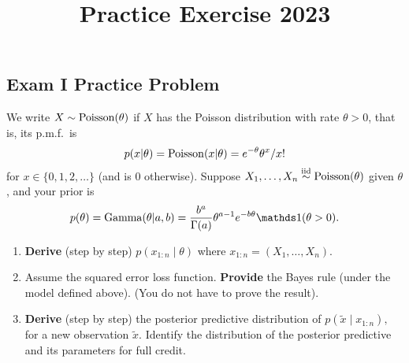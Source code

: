 \documentclass[12pt]{article}
\title{Practice Exercise 2023 }
\author{}
\date{}
\begin{document}
\maketitle



\subsection*{Exam I Practice Problem}
We write $X\sim\operatorname*{Poisson}(\theta)$ if $X$ has the Poisson distribution with rate $\theta>0$, that is, its p.m.f.\ is
$$ p(x|\theta) = \operatorname*{Poisson}(x|\theta)= e^{-\theta} \theta^x / x!$$
for $x\in\{0,1,2,\dotsc\}$ (and is $0$ otherwise). Suppose $X_1,\dotsc,X_n\stackrel{\mathrm{iid}}{\sim}\operatorname*{Poisson}(\theta)$ given $\theta$, and your prior is
$$ p(\theta) =\Ga(\theta|a,b) =\frac{b^a}{\Gamma(a)} \theta^{a-1} e^{-b\theta}\I(\theta>0) .$$

\vspace*{1em}

\begin{enumerate}
\item \textbf{Derive} (step by step) $p(x_{1:n} \mid \theta)$ where $x_{1:n} = (X_1,\dotsc,X_n).$
\item Assume the squared error loss function. \textbf{Provide} the Bayes rule (under the model defined above). (You do not have to prove the result).
\item \textbf{Derive} (step by step) the posterior predictive distribution of $p(\tilde{x} \mid x_{1:n}),$ for a new observation $\tilde{x}.$ Identify the distribution of the posterior predictive and its parameters for full credit. 


\end{enumerate}

\end{document}
